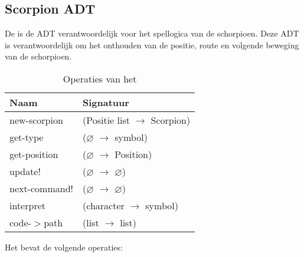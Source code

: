 \subsection{Scorpion ADT}
\label{section:scorpion}
De \texttt{} is de ADT verantwoordelijk voor het spellogica van de schorpioen. 
Deze ADT is verantwoordelijk om het onthouden van de positie, route en volgende beweging van de schorpioen.

\begin{table}[hbt]
\centering
\begin{tabular}{|ll|}
\hline
\rowcolor[HTML]{000000} 
{\color[HTML]{FFFFFF} \textbf{Naam}} & {\color[HTML]{FFFFFF} \textbf{Signatuur}} \\ \hline
new-scorpion    & (Positie list $\rightarrow$ Scorpion) \\ \hline
get-type      & ($\varnothing$ $\rightarrow$ symbol)                        \\ \hline
get-position  & ($\varnothing$ $\rightarrow$ Position)                        \\ \hline
update!                                 & ($\varnothing$ $\rightarrow$ $\varnothing$)                                       \\ \hline
next-command!                                 & ($\varnothing$ $\rightarrow$ $\varnothing$)                                       \\ \hline
interpret                                & (character $\rightarrow$ symbol)                 \\ \hline
code-$>$path                                & (list $\rightarrow$ list)                 \\ \hline
\end{tabular}
\caption{Operaties van het \texttt{}}
\label{table:scorpion}
\end{table}

Het \texttt{} bevat de volgende operaties:

